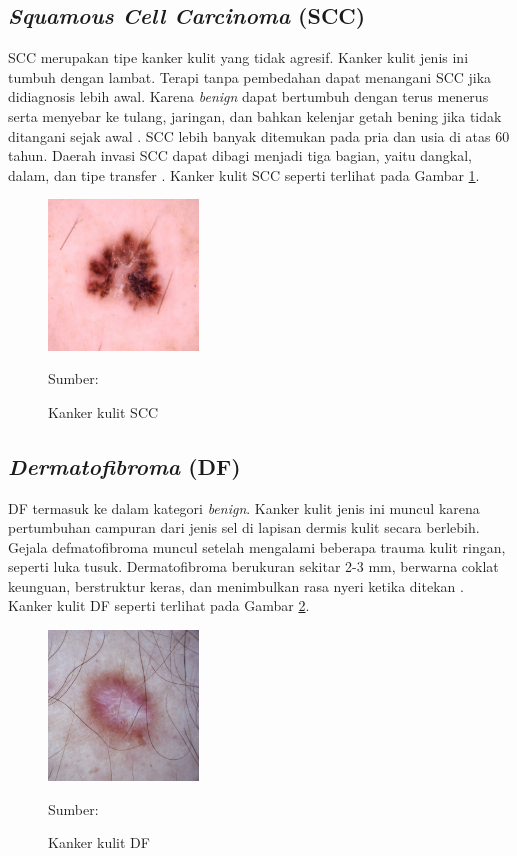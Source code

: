     \subsection{\textit{Squamous Cell Carcinoma} (SCC)}
    SCC merupakan tipe kanker kulit yang tidak agresif. Kanker kulit jenis ini tumbuh dengan lambat. Terapi tanpa pembedahan dapat menangani SCC jika didiagnosis lebih awal. Karena \textit{benign} dapat bertumbuh dengan terus menerus serta menyebar ke tulang, jaringan, dan bahkan kelenjar getah bening jika tidak ditangani sejak awal \citep{Fuadah2020a}. SCC lebih banyak ditemukan pada pria dan usia di atas 60 tahun. Daerah invasi SCC dapat dibagi menjadi tiga bagian, yaitu dangkal, dalam, dan tipe transfer \citep{Sang2019}. Kanker kulit SCC seperti terlihat pada Gambar \ref{fig:scc}.
    \begin{figure}[H] 
        \begin{center} 
            \includegraphics[width=4cm]{../img/Skin Cancer SCC - Latex.jpg}
            \caption{Kanker kulit SCC} 
            \label{fig:scc}
            Sumber: \citep{Codella2018,Combalia2019,Tschandl2018}
        \end{center} 
    \end{figure}

    \subsection{\textit{Dermatofibroma} (DF)}
    DF termasuk ke dalam kategori \textit{benign}. Kanker kulit jenis ini muncul karena pertumbuhan campuran dari jenis sel di lapisan dermis kulit secara berlebih. Gejala defmatofibroma muncul setelah mengalami beberapa trauma kulit ringan, seperti luka tusuk. Dermatofibroma berukuran sekitar 2-3 mm, berwarna coklat keunguan, berstruktur keras, dan menimbulkan rasa nyeri ketika ditekan \citep{Fuadah2020a}. Kanker kulit DF seperti terlihat pada Gambar \ref{fig:df}.
    \begin{figure}[H] 
        \begin{center} 
            \includegraphics[width=4cm]{../img/Skin Cancer DF - Latex.jpg}
            \caption{Kanker kulit DF} 
            \label{fig:df}
            Sumber: \citep{Codella2018,Combalia2019,Tschandl2018}
        \end{center} 
    \end{figure}

